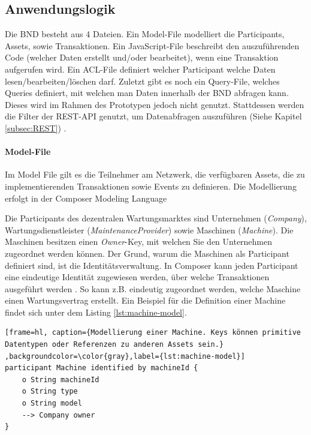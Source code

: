 \subsection{Anwendungslogik}
Die BND besteht aus 4 Dateien. Ein Model-File modelliert die Participants, Assets, sowie Transaktionen. Ein JavaScript-File beschreibt den auszuführenden Code (welcher Daten erstellt und/oder bearbeitet), wenn eine Transaktion aufgerufen wird. Ein ACL-File definiert welcher Participant welche Daten lesen/bearbeiten/löschen darf. Zuletzt gibt es noch ein Query-File, welches Queries definiert, mit welchen man Daten innerhalb der BND abfragen kann. Dieses wird im Rahmen des Prototypen jedoch nicht genutzt. Stattdessen werden die Filter der REST-API genutzt, um Datenabfragen auszuführen (Siehe Kapitel \ref{subsec:REST}) \cite{HyperledgerComposerTeamIntroductionHyperledgerComposer}.

\paragraph{Model-File}
Im Model File gilt es die Teilnehmer am Netzwerk, die verfügbaren Assets, die zu implementierenden Transaktionen sowie Events zu definieren. Die Modellierung erfolgt in der Composer Modeling Language \cite{HyperledgerComposerTeamModelingLanguageHyperledger}

Die Participants des dezentralen Wartungsmarktes sind Unternehmen (\textit{Company}), Wartungsdienstleister (\textit{MaintenanceProvider}) sowie Maschinen (\textit{Machine}). Die Maschinen besitzen einen \textit{Owner}-Key, mit welchen Sie den Unternehmen zugeordnet werden können. Der Grund, warum die Maschinen als Participant definiert sind, ist die Identitätsverwaltung. In Composer kann jeden Participant eine eindeutige Identität zugewiesen werden, über welche Transaktionen ausgeführt werden \cite{HyperledgerComposerTeamParticipantsidentitiesHyperledger}. So kann z.B. eindeutig zugeordnet werden, welche Maschine einen Wartungsvertrag erstellt. Ein Beispiel für die Definition einer Machine findet sich unter dem Listing \ref{lst:machine-model}.

\begin{lstfloat}
\begin{lstlisting}[frame=hl, caption={Modellierung einer Machine. Keys können primitive Datentypen oder Referenzen zu anderen Assets sein.} ,backgroundcolor=\color{gray},label={lst:machine-model}]
participant Machine identified by machineId {
    o String machineId
    o String type
    o String model
    --> Company owner
}
\end{lstlisting} 
\end{lstfloat}

